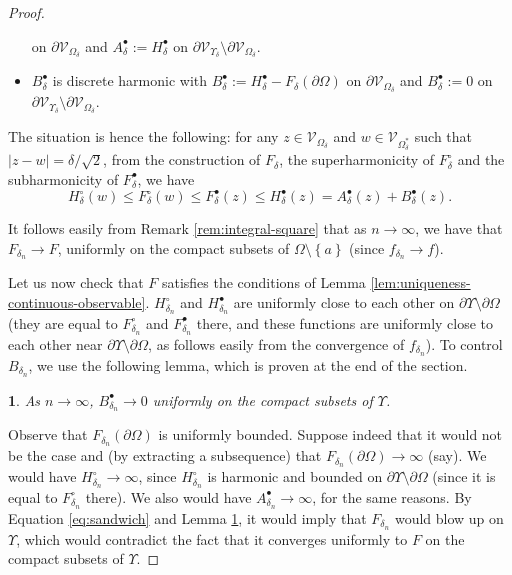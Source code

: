 \documentclass[oneside,english]{amsart}
\numberwithin{equation}{section}
\numberwithin{figure}{section}
\theoremstyle{plain}
\theoremstyle{plain}
\theoremstyle{plain}
\theoremstyle{plain}
\theoremstyle{plain}
\newtheorem{lem}[thm]{\protect\lemmaname}
\theoremstyle{definition}
\theoremstyle{remark}
\providecommand{\lemmaname}{Lemma}
\begin{document}
\begin{proof}
\begin{itemize}
on $\partial\mathcal{V}_{\Omega_{\delta}}$ and $A_{\delta}^{\bullet}:=H_{\delta}^{\bullet}$
on $\partial\mathcal{V}_{\Upsilon_{\delta}}\setminus\partial\mathcal{V}_{\Omega_{\delta}}$.
\item $B_{\delta}^{\bullet}$ is discrete harmonic with $B_{\delta}^{\bullet}:=H_{\delta}^{\bullet}-F_{\delta}\left(\partial\Omega\right)$
on $\partial\mathcal{V}_{\Omega_{\delta}}$ and $B_{\delta}^{\bullet}:=0$
on $\partial\mathcal{V}_{\Upsilon_{\delta}}\setminus\partial\mathcal{V}_{\Omega_{\delta}}$.
\end{itemize}
The situation is hence the following: for any $z\in\mathcal{V}_{\Omega_{\delta}}$
and $w\in\mathcal{V}_{\Omega_{\delta}^{*}}$ such that $\left|z-w\right|=\delta/\sqrt{2}$,
from the construction of $F_{\delta}$, the superharmonicity of $F_{\delta}^{\circ}$
and the subharmonicity of $F_{\delta}^{\bullet}$, we have
\begin{equation}
H_{\delta}^{\circ}\left(w\right)\leq F_{\delta}^{\circ}\left(w\right)\leq F_{\delta}^{\bullet}\left(z\right)\leq H_{\delta}^{\bullet}\left(z\right)=A_{\delta}^{\bullet}\left(z\right)+B_{\delta}^{\bullet}\left(z\right).\label{eq:sandwich}
\end{equation}


It follows easily from Remark \ref{rem:integral-square} that as $n\to\infty$,
we have that $F_{\delta_{n}}\to F$, uniformly on the compact subsets
of $\Omega\setminus\left\{ a\right\} $ (since $f_{\delta_{n}}\to f$).

Let us now check that $F$ satisfies the conditions of Lemma \ref{lem:uniqueness-continuous-observable}.
$H_{\delta_{n}}^{\circ}$ and $H_{\delta_{n}}^{\bullet}$ are uniformly
close to each other on $\partial\Upsilon\setminus\partial\Omega$
(they are equal to $F_{\delta_{n}}^{\circ}$ and $F_{\delta_{n}}^{\bullet}$
there, and these functions are uniformly close to each other near
$\partial\Upsilon\setminus\partial\Omega$, as follows easily from
the convergence of $f_{\delta_{n}}$). To control $B_{\delta_{n}}$,
we use the following lemma, which is proven at the end of the section.
\begin{lem}
\label{lem:small-harmonic-function}As $n\to\infty$, $B_{\delta_{n}}^{\bullet}\to0$
uniformly on the compact subsets of $\Upsilon$. 
\end{lem}
Observe that $F_{\delta_{n}}\left(\partial\Omega\right)$ is uniformly
bounded. Suppose indeed that it would not be the case and (by extracting
a subsequence) that $F_{\delta_{n}}\left(\partial\Omega\right)\to\infty$
(say). We would have $H_{\delta_{n}}^{\circ}\to\infty$, since $H_{\delta_{n}}^{\circ}$
is harmonic and bounded on $\partial\Upsilon\setminus\partial\Omega$
(since it is equal to $F_{\delta_{n}}^{\circ}$ there). We also would
have $A_{\delta_{n}}^{\bullet}\to\infty$, for the same reasons. By
Equation \ref{eq:sandwich} and Lemma \ref{lem:small-harmonic-function},
it would imply that $F_{\delta_{n}}$ would blow up on $\Upsilon$,
which would contradict the fact that it converges uniformly to $F$
on the compact subsets of $\Upsilon$. 


\end{proof}
\end{document}
